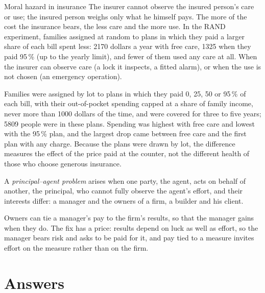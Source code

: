 \begin{model}{Moral hazard in insurance}
\assumes The insurer cannot observe the insured person's care or use; the insured person weighs only what he himself pays.
\predicts The more of the cost the insurance bears, the less care and the more use.
\tested In the RAND experiment, families assigned at random to plans in which they paid a larger share of each bill spent less: 2170 dollars a year with free care,
  1325 when they paid 95\,\% (up to the yearly limit), and fewer of them used any care at all.
\breaks When the insurer can observe care (a lock it inspects, a fitted alarm), or when the use is not chosen (an emergency operation).
\end{model}

\begin{record}[The RAND Health Insurance Experiment, 1974--82]
Families were assigned by lot to plans in which they paid 0, 25, 50 or 95\,\% of each bill, with their out-of-pocket spending capped at a share of family income, never more than 1000 dollars of the time, and were
covered for three to five years; 5809 people were in these plans. Spending was highest with free care and lowest with the 95\,\% plan, and the largest drop came
between free care and the first plan with any charge. Because the plans were drawn by lot, the difference measures the effect of the price paid at the counter, not
the different health of those who choose generous insurance.
\end{record}

\begin{definition}\label{def:g11:asymmetric-information:principal-agent}
A \emph{principal--agent problem} arises when one party, the agent, acts on behalf of another, the principal, who cannot fully observe
the agent's effort, and their interests differ: a manager and the owners of a firm, a builder and his client.
\end{definition}

Owners can tie a manager's pay to the firm's results, so that the manager gains when they do. The fix has a price: results depend on luck as well as effort, so the
manager bears risk and asks to be paid for it, and pay tied to a measure invites effort on the measure rather than on the firm.

\section{Answers}\label{sec:g11:asymmetric-information:answers}

